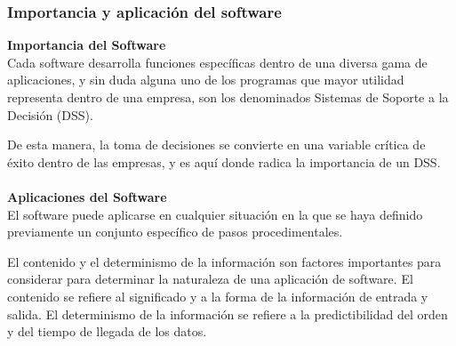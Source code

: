 \documentclass[12pt,twoside]{article}
\begin{document}
\subsubsection{Importancia y aplicación del software}
\textbf{Importancia del Software}\\

Cada software desarrolla funciones específicas dentro de una diversa gama de aplicaciones, 
y sin duda alguna uno de los programas que mayor utilidad representa dentro de una empresa, 
son los denominados Sistemas de Soporte a la Decisión (DSS).

De esta manera, la toma de decisiones se convierte en una variable crítica de éxito dentro 
de las empresas, y es aquí donde radica la importancia de un DSS. \\ \\
\textbf{Aplicaciones del Software}\\

El software puede aplicarse en cualquier situación en la que se haya definido previamente 
un conjunto específico de pasos procedimentales.

El contenido y el determinismo de la información son factores importantes para considerar 
para determinar la naturaleza de una aplicación de software. El contenido se refiere al 
significado y a la forma de la información de entrada y salida. El determinismo de la 
información se refiere a la predictibilidad del orden y del tiempo de llegada de los datos.
\end{document}
